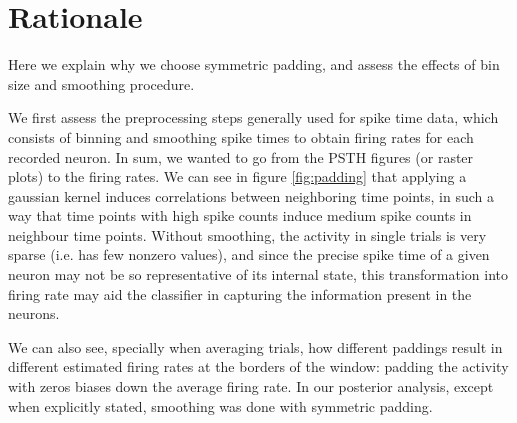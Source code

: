 \section{Rationale}
    Here we explain why we choose symmetric padding, and assess the effects of bin size and smoothing procedure.
    
    We first assess the preprocessing steps generally used for spike time data, which consists of binning and smoothing spike times to obtain firing rates for each recorded neuron. In sum, we wanted to go from the PSTH figures (or raster plots) to the firing rates. We can see in figure \ref{fig:padding} that applying a gaussian kernel induces correlations between neighboring time points, in such a way that time points with high spike counts induce medium spike counts in neighbour time points. Without smoothing, the activity in single trials is very sparse (i.e. has few nonzero values), and since the precise spike time of a given neuron may not be so representative of its internal state, this transformation into firing rate may aid the classifier in capturing the information present in the neurons.
    
    We can also see, specially when averaging trials, how different paddings result in different estimated firing rates at the borders of the window: padding the activity with zeros biases down the average firing rate. In our posterior analysis, except when explicitly stated, smoothing was done with symmetric padding.
    
